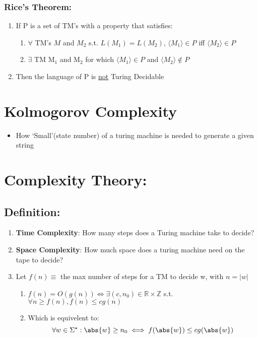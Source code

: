 \documentclass[11pt]{article}
\begin{document}
\subsubsection{Rice's Theorem:}
\label{sec-5.8.2}

\begin{enumerate}
\item If P is a set of TM's with a property that satisfies:

\begin{enumerate}
\item $\forall$ TM's $M$ and $M_2$ s.t. $L(M_1) = L(M_2)$,
          $\langle M_1 \rangle \in P$ iff $\langle M_2 \rangle \in P$
\item $\exists$ TM M$_1$ and M$_2$ for which $\langle M_1 \rangle \in
          P$ and $\langle M_2 \rangle \notin P$
\end{enumerate}

\item Then the language of P is \underline{not} Turing Decidable
\end{enumerate}
\section{Kolmogorov Complexity}
\label{sec-6}

\begin{itemize}
\item How `Small'(state number) of a turing machine is needed to
    generate a given string
\end{itemize}
\section{Complexity Theory:}
\label{sec-7}

\subsection{Definition:}
\label{sec-7.1}

\begin{enumerate}
\item \textbf{Time Complexity}: How many steps does a Turing machine take to decide?
\item \textbf{Space Complexity}: How much space does a turing machine need on the tape to decide?
\item Let $f(n) \equiv$ the max number of steps for a TM to decide w,
      with $n=|w|$

\begin{enumerate}
\item $f(n) = O(g(n)) \iff \exists (c,n_0) \in \mathbb{R} \times \mathbb{Z}$ s.t. $\forall n \geq
         f(n), f(n) \leq c g(n)$
\item Which is equivelent to: 
         \begin{equation}
         \forall w \in \Sigma^{\star}: \abs{w} \geq n_0 \iff f(\abs{w}) \leq c g(\abs{w})
         \end{equation}
\end{enumerate}

\end{enumerate}
\end{document}
